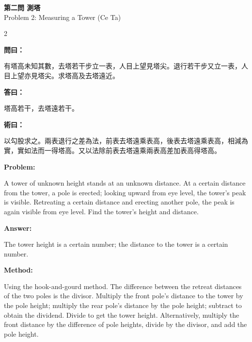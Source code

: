 \documentclass[11pt,a4paper]{article}
\newcommand{\wen}{\textbf{\color{sectioncolor}問}}
\newcommand{\da}{\textbf{\color{answercolor}答}}
\newcommand{\shu}{\textbf{\color{methodcolor}術}}
\newcommand{\prob}{\textbf{\color{sectioncolor}Problem}}
\newcommand{\ans}{\textbf{\color{answercolor}Answer}}
\newcommand{\meth}{\textbf{\color{methodcolor}Method}}
\newcommand{\probheader}[2]{%
  \begin{center}
  \colorbox{problembg}{\parbox{\dimexpr\linewidth-4pt}{%
    \centering\smallskip
    {\large\bfseries\color{sectioncolor}#1}\\[0.3em]
    {\normalsize\color{subsectioncolor}#2}%
    \smallskip
  }}
  \end{center}
  \vspace{0.5em}
}
\newenvironment{zhanswer}{%
  \medskip\noindent{\color{answercolor}\rule{0.9\columnwidth}{0.4pt}}%
  \par\color{answercolor}\small
}{\par\medskip}
\newenvironment{enanswer}{%
  \medskip\noindent{\color{answercolor}\rule{0.9\columnwidth}{0.4pt}}%
  \par\color{answercolor}\small
}{\par\medskip}
\newenvironment{zhmethod}{%
  \medskip\noindent{\color{methodcolor}\rule{0.9\columnwidth}{0.4pt}}%
  \par\color{methodcolor}\small
}{\par\medskip}
\newenvironment{enmethod}{%
  \medskip\noindent{\color{methodcolor}\rule{0.9\columnwidth}{0.4pt}}%
  \par\color{methodcolor}\small
}{\par\medskip}
\begin{document}
\probheader{第二問 測塔}{Problem 2: Measuring a Tower (Ce Ta)}

\begin{paracol}{2}

\switchcolumn[0]
\noindent\wen\textbf{曰：}

有塔高未知其數，去塔若干步立一表，人目上望見塔尖。退行若干步又立一表，人目上望亦見塔尖。求塔高及去塔遠近。

\begin{zhanswer}
\noindent\da\textbf{曰：}

塔高若干，去塔遠若干。
\end{zhanswer}

\begin{zhmethod}
\noindent\shu\textbf{曰：}

以勾股求之。兩表退行之差為法，前表去塔遠乘表高，後表去塔遠乘表高，相減為實，實如法而一得塔高。又以法除前表去塔遠乘兩表高差加表高得塔高。
\end{zhmethod}

\switchcolumn[1]
\noindent\prob\textbf{:}

A tower of unknown height stands at an unknown distance. At a certain distance from the tower, a pole is erected; looking upward from eye level, the tower's peak is visible. Retreating a certain distance and erecting another pole, the peak is again visible from eye level. Find the tower's height and distance.
\begin{enanswer}
\noindent\ans\textbf{:}

The tower height is a certain number; the distance to the tower is a certain number.
\end{enanswer}

\begin{enmethod}
\noindent\meth\textbf{:}

Using the hook-and-gourd method. The difference between the retreat distances of the two poles is the divisor. Multiply the front pole's distance to the tower by the pole height; multiply the rear pole's distance by the pole height; subtract to obtain the dividend. Divide to get the tower height. Alternatively, multiply the front distance by the difference of pole heights, divide by the divisor, and add the pole height.
\end{enmethod}

\end{paracol}

\vspace{0.5em}
\end{document}
